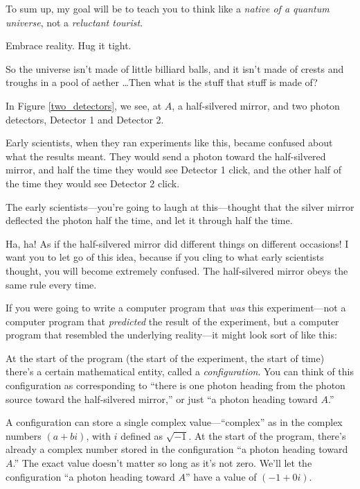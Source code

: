 {
 To sum up, my goal will be to teach you to think like a
\textit{native of a quantum universe}, not a \textit{reluctant
tourist}.}

{
 Embrace reality. Hug it tight.}

\myendsectiontext


{
 So the universe isn't made of little billiard
balls, and it isn't made of crests and troughs in a
pool of aether \ldots Then what is the stuff that stuff is made of?}


{
 In Figure \ref{two_detectors}, we see, at $A$, a half-silvered mirror, and two
photon detectors, Detector 1 and Detector 2.}

{
 Early scientists, when they ran experiments like this, became
confused about what the results meant. They would send a photon toward
the half-silvered mirror, and half the time they would see Detector 1
click, and the other half of the time they would see Detector 2 click.}

{
 The early scientists---you're going to laugh at
this---thought that the silver mirror deflected the photon half the
time, and let it through half the time.}

{
 Ha, ha! As if the half-silvered mirror did different things on
different occasions! I want you to let go of this idea, because if you
cling to what early scientists thought, you will become extremely
confused. The half-silvered mirror obeys the same rule every time.}

{
 If you were going to write a computer program that \textit{was}
this experiment---not a computer program that \textit{predicted} the
result of the experiment, but a computer program that resembled the
underlying reality---it might look sort of like this:}

{
 At the start of the program (the start of the experiment, the
start of time) there's a certain mathematical entity,
called a \textit{configuration}. You can think of this configuration as
corresponding to ``there is one photon heading from
the photon source toward the half-silvered mirror,''
or just ``a photon heading toward
$A$.''}

{
 A configuration can store a single complex
value---``complex'' as in the
complex numbers $(a + bi)$, with $i$ defined as $\sqrt{-1}$. At the start
of the program, there's already a complex number stored
in the configuration ``a photon heading toward
$A$.'' The exact value doesn't matter
so long as it's not zero. We'll let the
configuration ``a photon heading toward
$A$'' have a value of $(-1 + 0i)$.}

